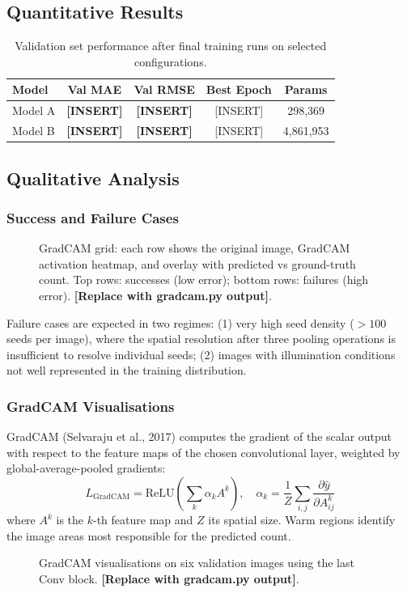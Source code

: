 \documentclass[11pt,a4paper]{article}
\begin{document}
\subsection{Quantitative Results}

\begin{table}[h]
\centering
\caption{Validation set performance after final training runs on selected configurations.}
\begin{tabular}{lcccc}
\toprule
Model & Val MAE & Val RMSE & Best Epoch & Params \\
\midrule
Model A & \textbf{[INSERT]} & \textbf{[INSERT]} & [INSERT] & 298,369 \\
Model B & \textbf{[INSERT]} & \textbf{[INSERT]} & [INSERT] & 4,861,953 \\
\bottomrule
\end{tabular}
\end{table}

\subsection{Qualitative Analysis}

\subsubsection{Success and Failure Cases}

\begin{figure}[h]
\centering
\fbox{\rule{0pt}{5cm}\rule{\linewidth}{0pt}}
\caption{GradCAM grid: each row shows the original image, GradCAM activation heatmap,
and overlay with predicted vs ground-truth count. Top rows: successes (low error);
bottom rows: failures (high error). \textbf{[Replace with gradcam.py output]}.}
\label{fig:gradcam}
\end{figure}

Failure cases are expected in two regimes: (1) very high seed density ($>100$ seeds per
image), where the spatial resolution after three pooling operations is insufficient to
resolve individual seeds; (2) images with illumination conditions not well represented in
the training distribution.

\subsubsection{GradCAM Visualisations}

GradCAM (Selvaraju et al., 2017) computes the gradient of the scalar output with respect
to the feature maps of the chosen convolutional layer, weighted by global-average-pooled
gradients:
\begin{equation}
  L_{\text{GradCAM}} = \text{ReLU}\!\left(\sum_k \alpha_k A^k\right),
  \quad
  \alpha_k = \frac{1}{Z}\sum_{i,j} \frac{\partial \hat{y}}{\partial A^k_{ij}}
\end{equation}
where $A^k$ is the $k$-th feature map and $Z$ its spatial size. Warm regions identify
the image areas most responsible for the predicted count.

\begin{figure}[h]
\centering
\fbox{\rule{0pt}{4cm}\rule{\linewidth}{0pt}}
\caption{GradCAM visualisations on six validation images using the last Conv block.
\textbf{[Replace with gradcam.py output]}.}
\end{figure}
\end{document}
